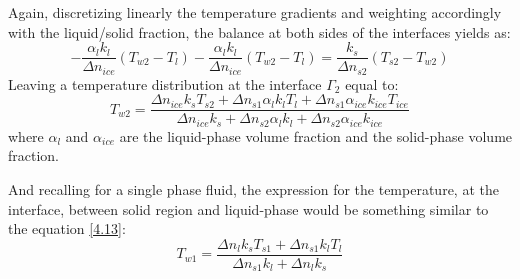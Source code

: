 \noindent Again, discretizing linearly the temperature gradients and weighting accordingly with the liquid/solid fraction, the balance at both sides of the interfaces yields as:
\begin{equation}
	-\frac{\alpha_{l} k_{l}}{\Delta n_{ice}}\left(T_{w 2}-T_{l}\right)-\frac{\alpha_{l} k_{l}}{\Delta n_{ice}}\left(T_{w 2}-T_{l}\right)=\frac{k_{s}}{\Delta n_{s 2}}\left(T_{s 2}-T_{w 2}\right)
	\label{4.16}
\end{equation}
Leaving a temperature distribution at the interface $\Gamma_{2}$ equal to:
\begin{equation}
	T_{w 2}=\frac{\Delta n_{ice} k_{s} T_{s 2}+\Delta n_{s 1} \alpha_{l} k_{l} T_{l}+\Delta n_{s 1} \alpha_{ice} k_{ice} T_{ice}}{\Delta n_{ice} k_{s}+\Delta n_{s 2} \alpha_{l} k_{l}+\Delta n_{s 2} \alpha_{ice} k_{ice}}
	\label{4.17}
\end{equation}
where $\alpha_{l}$ and $\alpha_{ice}$ are the liquid-phase volume fraction and the solid-phase volume fraction.

\noindent And recalling for a single phase fluid, the expression for the temperature, at the interface, between solid region and liquid-phase would be something similar to the equation \ref{4.13}:
\begin{equation}
	T_{w 1}=\frac{\Delta n_{l} k_{s} T_{s 1}+\Delta n_{s 1} k_{l} T_{l}}{\Delta n_{s 1} k_{l}+\Delta n_{l} k_{s}}
	\label{4.18}
\end{equation}


